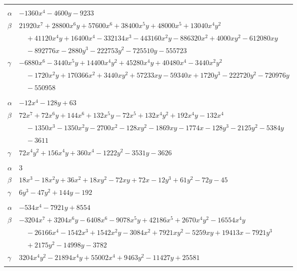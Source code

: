 \documentclass[11pt]{article}
\begin{document}
\begin{longtable}{@{}ll@{}}
\addlinespace[3pt]
\multicolumn{2}{@{}l}{$\{i,j\}=\{5,82\}$, $k_{ij}=3^{3}\cdot 11$}\\
$\alpha$ & $-1360x^{4}-4600y-9233$\\
$\beta$ & $21920x^{7}+28800x^{6}y+57600x^{6}+38400x^{5}y+48000x^{5}+13040x^{4}y^{2}$\\
 & $\quad +41120x^{4}y+16400x^{4}-332134x^{3}-443160x^{2}y-886320x^{2}+4000xy^{2}-612080xy$\\
 & $\quad -892776x-2880y^{3}-222753y^{2}-725510y-555723$\\
$\gamma$ & $-6880x^{6}-3440x^{5}y+14400x^{4}y^{2}+45280x^{4}y+40480x^{4}-3440x^{2}y^{2}$\\
 & $\quad -1720x^{2}y+170366x^{2}+3440xy^{2}+57233xy-59340x+1720y^{3}-222720y^{2}-720976y$\\
 & $\quad -550958$\\
\addlinespace[3pt]
\multicolumn{2}{@{}l}{$\{i,j\}=\{5,90\}$, $k_{ij}=3\cdot 11$}\\
$\alpha$ & $-12x^{4}-128y+63$\\
$\beta$ & $72x^{7}+72x^{6}y+144x^{6}+132x^{5}y-72x^{5}+132x^{4}y^{2}+192x^{4}y-132x^{4}$\\
 & $\quad -1350x^{3}-1350x^{2}y-2700x^{2}-128xy^{2}-1869xy-1774x-128y^{3}-2125y^{2}-5384y$\\
 & $\quad -3611$\\
$\gamma$ & $72x^{4}y^{2}+156x^{4}y+360x^{4}-1222y^{2}-3531y-3626$\\
\addlinespace[3pt]
\multicolumn{2}{@{}l}{$\{i,j\}=\{6,17\}$, $k_{ij}=3^{3}\cdot 11$}\\
$\alpha$ & $3$\\
$\beta$ & $18x^{3}-18x^{2}y+36x^{2}+18xy^{2}-72xy+72x-12y^{3}+61y^{2}-72y-45$\\
$\gamma$ & $6y^{3}-47y^{2}+144y-192$\\
\addlinespace[3pt]
\multicolumn{2}{@{}l}{$\{i,j\}=\{6,33\}$, $k_{ij}=2\cdot 3^{2}\cdot 5\cdot 11$}\\
$\alpha$ & $-534x^{4}-7921y+8554$\\
$\beta$ & $-3204x^{7}+3204x^{6}y-6408x^{6}-9078x^{5}y+42186x^{5}+2670x^{4}y^{2}-16554x^{4}y$\\
 & $\quad -26166x^{4}-1542x^{3}+1542x^{2}y-3084x^{2}+7921xy^{2}-5259xy+19413x-7921y^{3}$\\
 & $\quad +2175y^{2}-14998y-3782$\\
$\gamma$ & $3204x^{4}y^{2}-21894x^{4}y+55002x^{4}+9463y^{2}-11427y+25581$\\
\addlinespace[3pt]
\multicolumn{2}{@{}l}{$\{i,j\}=\{6,52\}$, $k_{ij}=2^{4}\cdot 3^{2}\cdot 5^{2}$}\\

\end{longtable}
\end{document}
